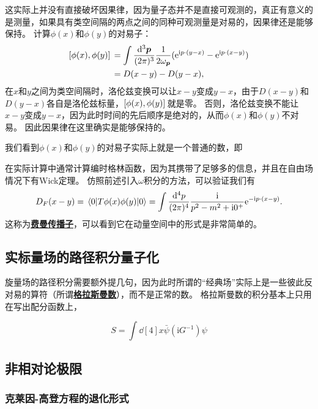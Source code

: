 \documentclass[hyperref, UTF8, a4paper]{ctexart}
\newcommand*{\ii}{\mathrm{i}}
\newcommand*{\ee}{\mathrm{e}}
\newcommand{\concept}[1]{\underline{\textbf{#1}}}
\begin{document}
这实际上并没有直接破坏因果律，因为量子态并不是直接可观测的，真正有意义的是测量，如果具有类空间隔的两点之间的同种可观测量是对易的，因果律还是能够保持。
计算$\phi(x)$和$\phi(y)$的对易子：
\begin{equation}
    \begin{aligned}
        \comm*{\phi(x)}{\phi(y)} &= \int \frac{\dd[3]{\vb*{p}}}{(2\pi)^3} \frac{1}{2 \omega_{\vb*{p}}} (\ee^{\ii p \cdot (y - x)} - \ee^{\ii p \cdot (x - y)}) \\
        &= D(x-y) - D(y-x),
    \end{aligned}
\end{equation}
在$x$和$y$之间为类空间隔时，洛伦兹变换可以让$x-y$变成$y-x$，由于$D(x-y)$和$D(y-x)$各自是洛伦兹标量，$\comm*{\phi(x)}{\phi(y)}$就是零。
否则，洛伦兹变换不能让$x-y$变成$y-x$，因为此时时间的先后顺序是绝对的，从而$\phi(x)$和$\phi(y)$不对易。
因此因果律在这里确实是能够保持的。

我们看到$\phi(x)$和$\phi(y)$的对易子实际上就是一个普通的数，即

在实际计算中通常计算编时格林函数，因为其携带了足够多的信息，并且在自由场情况下有Wick定理。
仿照前述引入$\omega$积分的方法，可以验证我们有
\begin{equation}
    D_F(x-y) = \mel*{0}{T \phi(x) \phi(y)}{0} = \int \frac{\dd[4]{p}}{(2\pi)^4} \frac{\ii}{p^2 - m^2 + \ii 0^+} \ee^{- \ii p \cdot (x - y)}.
\end{equation}
这称为\concept{费曼传播子}，可以看到它在动量空间中的形式是非常简单的。

\subsection{实标量场的路径积分量子化}

旋量场的路径积分需要额外提几句，因为此时所谓的“经典场”实际上是一些彼此反对易的算符（所谓\concept{格拉斯曼数}），而不是正常的数。
格拉斯曼数的积分基本上只用在写出配分函数上，

\[
    S = \int \dd[4]{x} \bar{\psi} (\ii G^{-1}) \psi
\]

\subsection{非相对论极限}

\subsubsection{克莱因-高登方程的退化形式}\label{sec:sch-eq-from-kg}
\end{document}
